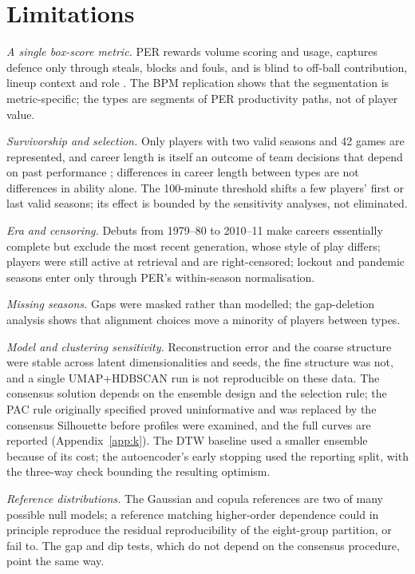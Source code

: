 \section{Limitations}\label{sec:limitations}

\emph{A single box-score metric.} PER rewards volume scoring and usage, captures defence only through steals, blocks and fouls, and is blind to off-ball contribution, lineup context and role \citep{kubatko2007,berri2010,martinez2011}. The BPM replication shows that the segmentation is metric-specific; the types are segments of PER productivity paths, not of player value.

\emph{Survivorship and selection.} Only players with two valid seasons and 42 games are represented, and career length is itself an outcome of team decisions that depend on past performance \citep{coates2010,deutscher2017}; differences in career length between types are not differences in ability alone. The 100-minute threshold shifts a few players' first or last valid seasons; its effect is bounded by the sensitivity analyses, not eliminated.

\emph{Era and censoring.} Debuts from 1979--80 to 2010--11 make careers essentially complete but exclude the most recent generation, whose style of play differs; \nActive{} players were still active at retrieval and are right-censored; lockout and pandemic seasons enter only through PER's within-season normalisation.

\emph{Missing seasons.} Gaps were masked rather than modelled; the gap-deletion analysis shows that alignment choices move a minority of players between types.

\emph{Model and clustering sensitivity.} Reconstruction error and the coarse structure were stable across latent dimensionalities and seeds, the fine structure was not, and a single UMAP+HDBSCAN run is not reproducible on these data. The consensus solution depends on the ensemble design and the selection rule; the PAC rule originally specified proved uninformative and was replaced by the consensus Silhouette before profiles were examined, and the full curves are reported (Appendix~\ref{app:k}). The DTW baseline used a smaller ensemble because of its cost; the autoencoder's early stopping used the reporting split, with the three-way check bounding the resulting optimism.

\emph{Reference distributions.} The Gaussian and copula references are two of many possible null models; a reference matching higher-order dependence could in principle reproduce the residual reproducibility of the eight-group partition, or fail to. The gap and dip tests, which do not depend on the consensus procedure, point the same way.

